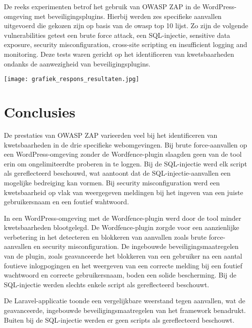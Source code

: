 \documentclass[a0,portrait]{hogent-poster}
\begin{document}
\begin{multicols}{2}
De reeks experimenten betrof het gebruik van OWASP ZAP in de WordPress-omgeving met beveiligingsplugins. 
Hierbij werden zes specifieke aanvallen uitgevoerd die gekozen zijn op basis van de owasp top 10 lijst. Zo zijn 
de volgende vulnerabilities getest een brute force attack, een SQL-injectie, sensitive data exposure, security 
misconfiguration, cross-site scripting en insufficient logging and monitoring. Deze tests waren 
gericht op het identificeren van kwetsbaarheden ondanks de aanwezigheid van beveiligingsplugins.

\begin{center}
  \captionsetup{type=figure}
  \texttt{[image: grafiek\_respons\_resultaten.jpg]}
\end{center}


\section{Conclusies}

De prestaties van OWASP ZAP varieerden veel bij het identificeren van kwetsbaarheden in de 
drie specifieke webomgevingen. Bij brute force-aanvallen op een WordPress-omgeving zonder de Wordfence-plugin 
slaagden geen van de tool erin om ongelimiteerdte proberen in te loggen. Bij de SQL-injectie werd elk script als gereflecteerd 
beschouwd, wat aantoont dat de SQL-injectie-aanvallen een mogelijke bedreiging kan vormen. Bij security misconfiguration 
werd een kwetsbaarheid op vlak van weergegeven meldingen bij het ingeven van een juiste gebruikersnaam en een foutief wahtwoord.

In een WordPress-omgeving met de Wordfence-plugin werd door de tool minder kwetsbaarheden blootgelegd. 
De Wordfence-plugin zorgde voor een aanzienlijke verbetering in het detecteren en blokkeren van aanvallen 
zoals brute force-aanvallen en security misconfiguration. De ingebouwde beveiligingsmaatregelen van de plugin, zoals geavanceerde 
het blokkeren van een gebruiker na een aantal foutieve inlogpogingen en het weergeven van een correcte melding bij een foutief wachtwoord 
en correcte gebruikersnaam, boden een solide bescherming. Bij de SQL-injectie werden slechts enkele script als gereflecteerd beschouwt.

De Laravel-applicatie toonde een vergelijkbare weerstand tegen aanvallen, wat de geavanceerde, ingebouwde beveiligingsmaatregelen van 
het framework benadrukt. Buiten bij de SQL-injectie werden er geen scripts als gereflecteerd beschouwt.


\end{multicols}
\end{document}

